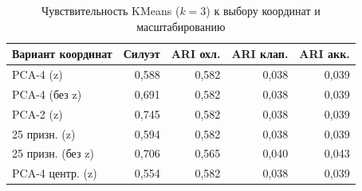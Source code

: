 \begin{table}[H]
\centering
\small
\caption{Чувствительность KMeans ($k = 3$) к выбору координат и масштабированию}\label{tab:sensitivity}
\begin{tabular}{lrrrr}
\toprule
Вариант координат & Силуэт & ARI охл. & ARI клап. & ARI акк. \\
\midrule
PCA-4 (z) & 0,588 & 0,582 & 0,038 & 0,039 \\
PCA-4 (без z) & 0,691 & 0,582 & 0,038 & 0,039 \\
PCA-2 (z) & 0,745 & 0,582 & 0,038 & 0,039 \\
25 призн. (z) & 0,594 & 0,582 & 0,038 & 0,039 \\
25 призн. (без z) & 0,706 & 0,565 & 0,040 & 0,043 \\
PCA-4 центр. (z) & 0,554 & 0,582 & 0,038 & 0,039 \\
\bottomrule
\end{tabular}
\end{table}
